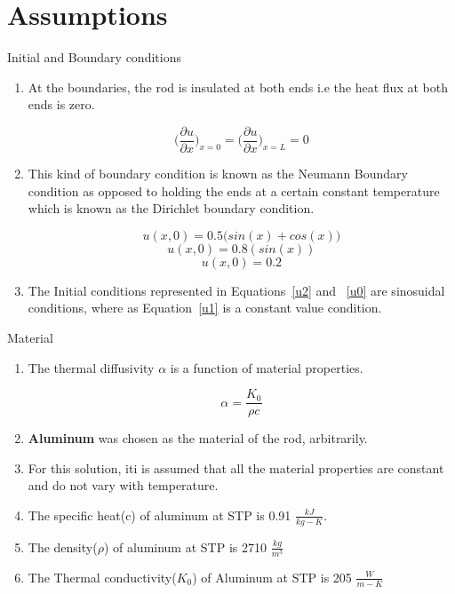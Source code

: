 \documentclass[10pt,compress]{beamer}
\begin{document}
\section{Assumptions}
\begin{frame}{Initial and Boundary conditions}
\begin{enumerate}
\item At the boundaries, the rod is insulated at both ends i.e the heat flux at both ends is zero.
\begin{center}
	\begin{equation} \label{neumannbc}
\bigg( \frac{\partial u}{\partial x} \bigg)_{x=0} = \bigg( \frac{\partial u}{\partial x} \bigg)_{x=L} = 0
\end{equation}
\end{center}
\item This kind of boundary condition is known as the Neumann Boundary condition as opposed to holding the ends at a certain constant temperature which is known as the Dirichlet boundary condition. 
\begin{center}
\begin{equation} \label{u2}
u(x,0)=0.5 \big (  sin(x)+cos(x) \big )
\end{equation}
\begin{equation} \label{u0}
u(x,0)=0.8(sin(x))
\end{equation}
\begin{equation} \label{u1}
u(x,0)=0.2
\end{equation}
\end{center}
\item The Initial conditions represented in Equations~\ref{u2} and ~\ref{u0} are sinosuidal conditions, where as Equation~\ref{u1} is a constant value condition.
\end{enumerate}
\end{frame}

\begin{frame}{Material}
\begin{enumerate}
\item The thermal diffusivity $\alpha$ is a function of material properties.
\begin{center}
	\begin{equation} \label{alpha}
\alpha = \frac{K_{0}}{\rho c}
\end{equation}
\end{center}
\item \textbf{Aluminum} was chosen as the material of the rod, arbitrarily.
\item For this solution, iti is assumed that all the material properties are constant and do not vary with temperature.
\item The specific heat(c) of aluminum at STP is 0.91 $\frac{kJ}{kg-K}$.
\item The density($\rho$) of aluminum at STP is 2710 $\frac{kg}{m^{3}}$
\item The Thermal conductivity($K_{0}$) of Aluminum at STP is 205 $\frac{W}{m-K}$
\end{enumerate}
\end{frame}
\end{document}
